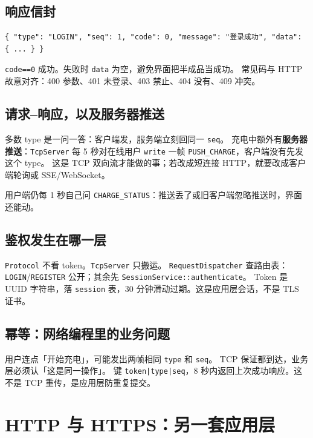 \documentclass[UTF8,a4paper,11pt]{ctexart}
\begin{document}
\subsection{响应信封}

\begin{lstlisting}[language={}]
{ "type": "LOGIN", "seq": 1, "code": 0, "message": "登录成功", "data": { ... } }
\end{lstlisting}

\texttt{code==0} 成功。失败时 \texttt{data} 为空，避免界面把半成品当成功。
常见码与 HTTP 故意对齐：400 参数、401 未登录、403 禁止、404 没有、409 冲突。

\subsection{请求--响应，以及服务器推送}

多数 type 是一问一答：客户端发，服务端立刻回同一 \texttt{seq}。
充电中额外有\textbf{服务器推送}：\texttt{TcpServer} 每 5 秒对在线用户 \texttt{write} 一帧 \texttt{PUSH\_CHARGE}，客户端没有先发这个 type。
这是 TCP 双向流才能做的事；若改成短连接 HTTP，就要改成客户端轮询或 SSE/WebSocket。

用户端仍每 1 秒自己问 \texttt{CHARGE\_STATUS}：推送丢了或旧客户端忽略推送时，界面还能动。

\subsection{鉴权发生在哪一层}

\texttt{Protocol} 不看 token。\texttt{TcpServer} 只搬运。
\texttt{RequestDispatcher} 查路由表：\texttt{LOGIN}/\texttt{REGISTER} 公开；其余先 \texttt{SessionService::authenticate}。
Token 是 UUID 字符串，落 \texttt{session} 表，30 分钟滑动过期。这是应用层会话，不是 TLS 证书。

\subsection{幂等：网络编程里的业务问题}

用户连点「开始充电」，可能发出两帧相同 \texttt{type} 和 \texttt{seq}。
TCP 保证都到达，业务层必须认「这是同一操作」。
键 \texttt{token|type|seq}，8 秒内返回上次成功响应。这不是 TCP 重传，是应用层防重复提交。

\section{HTTP 与 HTTPS：另一套应用层}
\end{document}
